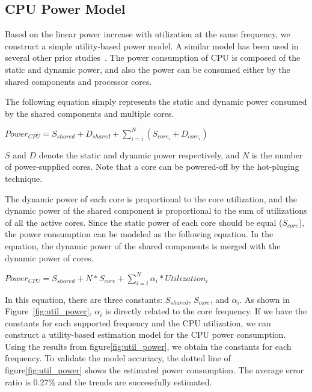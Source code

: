 \subsection{CPU Power Model}

Based on the linear power increase with utilization at the same frequency,
we construct a simple utility-based power model. A similar model
has been used in several other prior studies~\cite{isca11DVFS, VMpower}.
The power consumption of CPU is composed of the static and dynamic power,
and also the power can be consumed either by the shared components and processor cores.

The following equation simply represents the static and dynamic
power consumed by the shared components and multiple cores.

\begin{center}
\vspace{-0.05in}
$Power_{CPU} = S_{shared} + D_{shared} + \sum_{i=i}^{N} (S_{core_i} + D_{core_i})$
\vspace{-0.05in}
\end{center}

$S$ and $D$ denote the static and dynamic power respectively, and $N$ is the number of power-supplied cores. 
Note that a core can be powered-off by the hot-pluging technique.

The dynamic power of each core is proportional to the core utilization,
and the dynamic power of the shared component is proportional to the sum
of utilizations of all the active cores. 
Since the static power of each core should be equal ($S_{core}$),
the power consumption can be modeled as the following equation.
In the equation, the dynamic power of the shared components is
merged with the dynamic power of cores.

\begin{center}
\vspace{-0.05in}
$Power_{CPU} = S_{shared} + N * S_{core} + \sum_{i=i}^{N} \alpha_i * Utilization_i$
\vspace{-0.05in}
\end{center}

In this equation, there are three constants: $S_{shared}$, $S_{core}$, and $\alpha_i$.
As shown in Figure~\ref{fig:util_power}, $\alpha_i$ is directly related to the core frequency.
If we have the constants for each supported frequency and the CPU utilization,
we can construct a utility-based estimation model for the CPU power consumption.
Using the results from figure\ref{fig:util_power}, we obtain the constants for each frequency.
To validate the model accuriacy, the dotted line of figure\ref{fig:util_power} shows the 
estimated power consumption.
The average error ratio is 0.27\% and the trends are successfully estimated.
